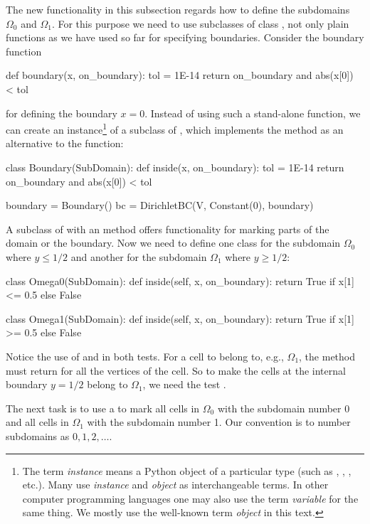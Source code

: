 The new functionality in this subsection regards how to define
the subdomains $\Omega_0$ and $\Omega_1$. For this purpose we need to
use subclasses of class ,  not only plain functions as we have used so far for specifying
boundaries. Consider the boundary function
\begin{python}
def boundary(x, on_boundary):
    tol = 1E-14
    return on_boundary and abs(x[0]) < tol
\end{python}
for defining the boundary $x=0$. Instead of using such a stand-alone
function, we can create an instance\footnote{The term \emph{instance}
means a Python object of a particular type (such as ,
, , etc.).  Many use \emph{instance}
and \emph{object} as interchangeable terms. In other computer programming
languages one may also use the term \emph{variable} for the same thing.
We mostly use the well-known term \emph{object} in this text.} of a
subclass of , which implements the  method
as an alternative to the  function:
\begin{python}
class Boundary(SubDomain):
    def inside(x, on_boundary):
        tol = 1E-14
        return on_boundary and abs(x[0]) < tol

boundary = Boundary()
bc = DirichletBC(V, Constant(0), boundary)
\end{python}

A subclass of  with an  method offers
functionality for marking parts of the domain or the boundary. Now
we need to define one class for the subdomain $\Omega_0$ where $y\leqslant
1/2$ and another for the subdomain $\Omega_1$ where $y\geqslant 1/2$:
\begin{python}
class Omega0(SubDomain):
    def inside(self, x, on_boundary):
        return True if x[1] <= 0.5 else False

class Omega1(SubDomain):
    def inside(self, x, on_boundary):
        return True if x[1] >= 0.5 else False
\end{python}
Notice the use of \emp{<=} and \emp{>=} in both tests. For a cell
to belong to, e.g., $\Omega_1$, the  method must return
 for all the vertices  of the cell. So to make the cells
at the internal boundary $y=1/2$ belong to $\Omega_1$, we need the test
.

The next task is to use a  to mark all cells in
$\Omega_0$ with the subdomain number 0 and all cells in $\Omega_1$
with the subdomain number 1.  Our convention is to number subdomains
as $0,1,2,\ldots$.

